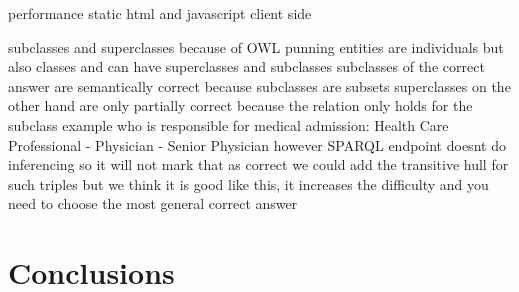 \documentclass{IOS-Book-Article}     %
\newcommand{\citet}{\cite}%
\begin{document}
performance 
static html and javascript
client side

\label{tab:templates} subclasses and superclasses
because of OWL punning entities are individuals but also classes and can have superclasses and subclasses
subclasses of the correct answer are semantically correct because subclasses are subsets
superclasses on the other hand are only partially correct because the relation only holds for the subclass
example who is responsible for medical admission: Health Care Professional - Physician - Senior Physician
however SPARQL endpoint doesnt do inferencing so it will not mark that as correct
we could add the transitive hull for such triples but we think it is good like this, it increases the difficulty and you need to choose the most general correct answer



\section{Conclusions}

%


\end{document}

